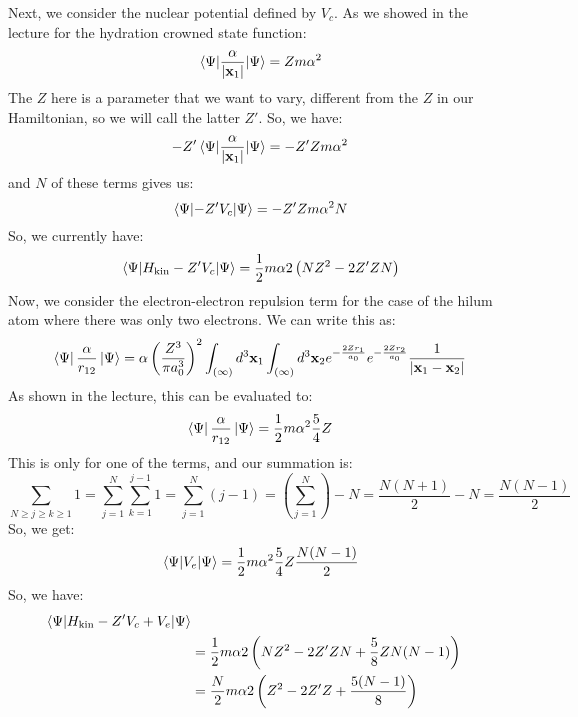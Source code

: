 \documentclass{article}[16pt]
\begin{document}
Next, we consider the nuclear potential defined by $V_c$. As we showed in the lecture for the hydration crowned state function:
\begin{equation}
    \expval{\frac{\alpha }{\abs{\textbf{x}_1}}}{\Psi } = Zm\alpha^2
\end{equation}
The $Z$ here is a parameter that we want to vary, different from the $Z$ in our Hamiltonian, so we will call the latter $Z'$. So, we have:
\begin{equation}
    -Z' \expval{\frac{\alpha }{\abs{\textbf{x}_1}}}{\Psi } = -Z'Zm\alpha^2
\end{equation}
and $N$ of these terms gives us:
\begin{equation}
    \expval{-Z'V_c}{\Psi } = -Z'Zm\alpha^2 N
\end{equation}
So, we currently have:
\begin{equation}
    \expval{H_{\text{kin}}-Z'V_c}{\Psi } = \frac{1}{2}m\alpha 2\left(NZ^2 - 2Z'ZN\right)
\end{equation}
Now, we consider the electron-electron repulsion term for the case of the hilum atom where there was only two electrons. We can write this as:
\begin{equation}
    \bra{\Psi }\frac{\alpha }{r_{12}}\ket{\Psi }= \alpha \left(\frac{Z^{3}}{\pi a_0^3}\right)^2 \int_{(\infty)} d^3 \textbf{x}_1 \int_{(\infty)} d^3 \textbf{x}_2 e^{-\frac{2Zr_1}{a_0}} e^{-\frac{2Zr_2}{a_0}} \frac{1}{\abs{\textbf{x}_1 - \textbf{x}_2}}
\end{equation}
As shown in the lecture, this can be evaluated to:
\begin{equation}
    \bra{\Psi }\frac{\alpha }{r_{12}}\ket{\Psi }= 
\frac{1}{2}m\alpha ^{2}\frac{5}{4}Z
\end{equation}
This is only for one of the terms, and our summation is:
\begin{equation}
\sum_{N\geq j \geq k \geq 1} 1 = \sum_{j=1}^{N}\sum_{k=1}^{j-1}1 = \sum_{j=1}^{N}(j-1) = \left(\sum_{j=1}^{N} \right)-N = \frac{N(N+1)}{2} - N = \frac{N(N-1)}{2}  
\end{equation}
So, we get:
\begin{equation}
    \expval{V_e}{\Psi } = \frac{1}{2}m\alpha ^{2}\frac{5}{4}Z \frac{N(N-1)}{2}
\end{equation}
So, we have:
\begin{align}
    \expval{H_{\text{kin}}-Z'V_c+V_e}{\Psi } \\ &= \frac{1}{2}m\alpha 2\left(NZ^2 - 2Z'ZN + \frac{5}{8}ZN(N-1)\right) \\ &= \frac{N}{2}m\alpha 2 \left(Z^2 - 2Z'Z+ \frac{5(N-1)}{8}\right)
\end{align}
\end{document}
